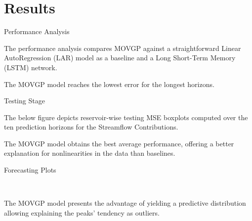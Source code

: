 \documentclass[10pt, xcolor=table]{beamer}
\newlength\figureheight
\newlength\figurewidth
\begin{document}
\section*{Results}
\begin{frame}{Performance Analysis}

    The performance analysis compares MOVGP against a straightforward Linear AutoRegression (LAR) model as a baseline and a Long Short-Term Memory (LSTM) network.
    
    \begin{figure}[htpb]
     \centering
     \setlength{}
     \setlength{}

    \end{figure}

    \textcolor{myNewColorA}{The MOVGP model reaches the lowest error for the longest horizons.}
    
\end{frame}

\begin{frame}{Testing Stage}

    The below figure depicts reservoir-wise testing MSE boxplots computed over the ten prediction horizons for the Streamflow Contributions.
    
    \begin{figure}[htpb]
     \centering
     \setlength\figurewidth{\columnwidth}
     \setlength{}
     
    \end{figure}

    \textcolor{myNewColorA}{The MOVGP model obtains the best average performance, offering a better explanation for nonlinearities in the data than baselines.}
    
\end{frame}

\begin{frame}{Forecasting Plots}
    
    \begin{figure}[htpb]
        \centering
        \setlength{}
        \setlength{}
        \subfloat{}
        \subfloat{}\\
    
        \subfloat{}
        \subfloat{}
    \end{figure}

     The MOVGP model presents the advantage of yielding a predictive distribution allowing explaining the peaks' tendency as outliers.

\end{frame}
\end{document}

